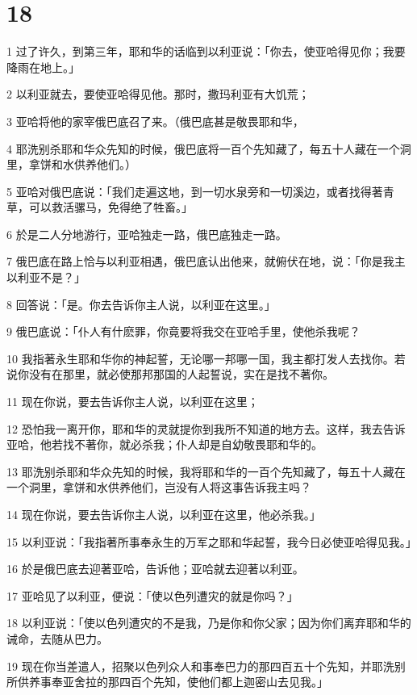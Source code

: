 \chapter{18}

\par 1 过了许久，到第三年，耶和华的话临到以利亚说：「你去，使亚哈得见你；我要降雨在地上。」
\par 2 以利亚就去，要使亚哈得见他。那时，撒玛利亚有大饥荒；
\par 3 亚哈将他的家宰俄巴底召了来。（俄巴底甚是敬畏耶和华，
\par 4 耶洗别杀耶和华众先知的时候，俄巴底将一百个先知藏了，每五十人藏在一个洞里，拿饼和水供养他们。）
\par 5 亚哈对俄巴底说：「我们走遍这地，到一切水泉旁和一切溪边，或者找得著青草，可以救活骡马，免得绝了牲畜。」
\par 6 於是二人分地游行，亚哈独走一路，俄巴底独走一路。
\par 7 俄巴底在路上恰与以利亚相遇，俄巴底认出他来，就俯伏在地，说：「你是我主以利亚不是？」
\par 8 回答说：「是。你去告诉你主人说，以利亚在这里。」
\par 9 俄巴底说：「仆人有什麽罪，你竟要将我交在亚哈手里，使他杀我呢？
\par 10 我指著永生耶和华你的神起誓，无论哪一邦哪一国，我主都打发人去找你。若说你没有在那里，就必使那邦那国的人起誓说，实在是找不著你。
\par 11 现在你说，要去告诉你主人说，以利亚在这里；
\par 12 恐怕我一离开你，耶和华的灵就提你到我所不知道的地方去。这样，我去告诉亚哈，他若找不著你，就必杀我；仆人却是自幼敬畏耶和华的。
\par 13 耶洗别杀耶和华众先知的时候，我将耶和华的一百个先知藏了，每五十人藏在一个洞里，拿饼和水供养他们，岂没有人将这事告诉我主吗？
\par 14 现在你说，要去告诉你主人说，以利亚在这里，他必杀我。」
\par 15 以利亚说：「我指著所事奉永生的万军之耶和华起誓，我今日必使亚哈得见我。」
\par 16 於是俄巴底去迎著亚哈，告诉他；亚哈就去迎著以利亚。
\par 17 亚哈见了以利亚，便说：「使以色列遭灾的就是你吗？」
\par 18 以利亚说：「使以色列遭灾的不是我，乃是你和你父家；因为你们离弃耶和华的诫命，去随从巴力。
\par 19 现在你当差遣人，招聚以色列众人和事奉巴力的那四百五十个先知，并耶洗别所供养事奉亚舍拉的那四百个先知，使他们都上迦密山去见我。」
